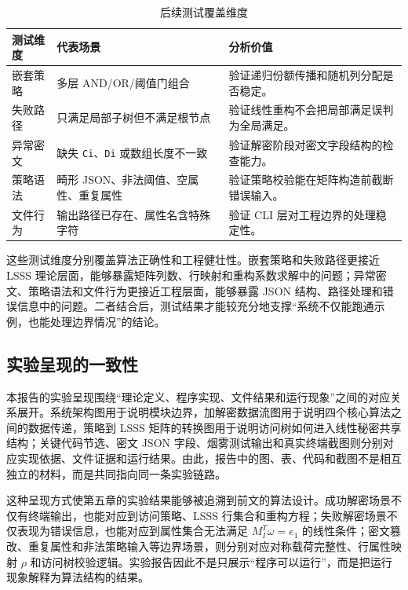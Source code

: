 \begin{table}[H]
\centering
\caption{后续测试覆盖维度}
\begin{tabular}{>{\raggedright\arraybackslash}p{} >{\raggedright\arraybackslash}p{} >{\raggedright\arraybackslash}p{}}
\toprule
测试维度 & 代表场景 & 分析价值 \\
\midrule
嵌套策略 & 多层 AND/OR/阈值门组合 & 验证递归份额传播和随机列分配是否稳定。\\
失败路径 & 只满足局部子树但不满足根节点 & 验证线性重构不会把局部满足误判为全局满足。\\
异常密文 & 缺失 \verb|Ci|、\verb|Di| 或数组长度不一致 & 验证解密阶段对密文字段结构的检查能力。\\
策略语法 & 畸形 JSON、非法阈值、空属性、重复属性 & 验证策略校验能在矩阵构造前截断错误输入。\\
文件行为 & 输出路径已存在、属性名含特殊字符 & 验证 CLI 层对工程边界的处理稳定性。\\
\bottomrule
\end{tabular}
\end{table}

这些测试维度分别覆盖算法正确性和工程健壮性。嵌套策略和失败路径更接近 LSSS 理论层面，能够暴露矩阵列数、行映射和重构系数求解中的问题；异常密文、策略语法和文件行为更接近工程层面，能够暴露 JSON 结构、路径处理和错误信息中的问题。二者结合后，测试结果才能较充分地支撑“系统不仅能跑通示例，也能处理边界情况”的结论。

\subsection{实验呈现的一致性}

本报告的实验呈现围绕“理论定义、程序实现、文件结果和运行现象”之间的对应关系展开。系统架构图用于说明模块边界，加解密数据流图用于说明四个核心算法之间的数据传递，策略到 LSSS 矩阵的转换图用于说明访问树如何进入线性秘密共享结构；关键代码节选、密文 JSON 字段、烟雾测试输出和真实终端截图则分别对应实现依据、文件证据和运行结果。由此，报告中的图、表、代码和截图不是相互独立的材料，而是共同指向同一条实验链路。

这种呈现方式使第五章的实验结果能够被追溯到前文的算法设计。成功解密场景不仅有终端输出，也能对应到访问策略、LSSS 行集合和重构方程；失败解密场景不仅表现为错误信息，也能对应到属性集合无法满足 $M_I^T\omega=e_1$ 的线性条件；密文篡改、重复属性和非法策略输入等边界场景，则分别对应对称载荷完整性、行属性映射 $\rho$ 和访问树校验逻辑。实验报告因此不是只展示“程序可以运行”，而是把运行现象解释为算法结构的结果。

